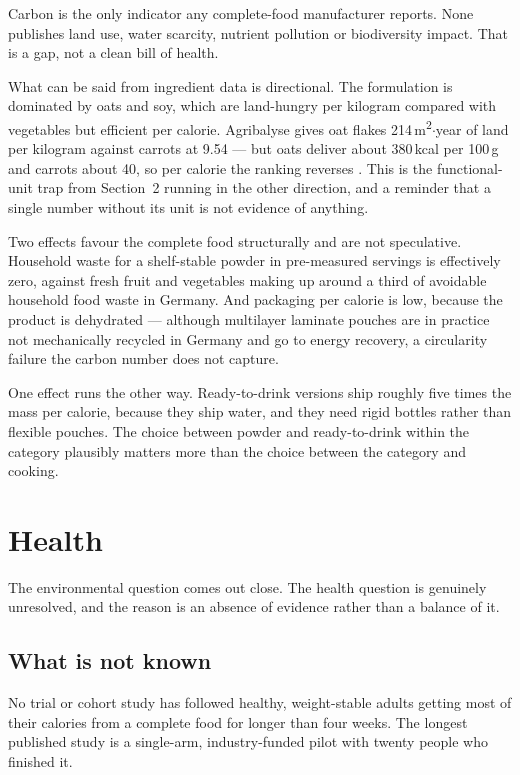 \documentclass[11pt,a4paper]{article}
\begin{document}
Carbon is the only indicator any complete-food manufacturer reports. None publishes
land use, water scarcity, nutrient pollution or biodiversity impact. That is a gap,
not a clean bill of health.

What can be said from ingredient data is directional. The formulation is dominated by
oats and soy, which are land-hungry per kilogram compared with vegetables but
efficient per calorie. Agribalyse gives oat flakes 214\,m\textsuperscript{2}$\cdot$year
of land per kilogram against carrots at 9.54 — but oats deliver about 380\,kcal per
100\,g and carrots about 40, so per calorie the ranking reverses \cite{agribalyse}.
This is the functional-unit trap from Section~2 running in the other direction, and a
reminder that a single number without its unit is not evidence of anything.

Two effects favour the complete food structurally and are not speculative. Household
waste for a shelf-stable powder in pre-measured servings is effectively zero, against
fresh fruit and vegetables making up around a third of avoidable household food waste
in Germany. And packaging per calorie is low, because the product is dehydrated —
although multilayer laminate pouches are in practice not mechanically recycled in
Germany and go to energy recovery, a circularity failure the carbon number does not
capture.

One effect runs the other way. Ready-to-drink versions ship roughly five times the
mass per calorie, because they ship water, and they need rigid bottles rather than
flexible pouches. The choice between powder and ready-to-drink within the category
plausibly matters more than the choice between the category and cooking.

\section{Health}

The environmental question comes out close. The health question is genuinely
unresolved, and the reason is an absence of evidence rather than a balance of it.

\subsection{What is not known}

No trial or cohort study has followed healthy, weight-stable adults getting most of
their calories from a complete food for longer than four weeks. The longest published
study is a single-arm, industry-funded pilot with twenty people who finished it.
\end{document}
